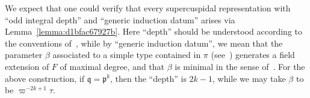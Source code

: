 \documentclass[reqno]{amsart}
\theoremstyle{plain} \newtheorem{theorem} {Theorem} \newtheorem{conjecture} {Conjecture} \newtheorem{corollary} [theorem] {Corollary} \newtheorem{proposition} [theorem] {Proposition} \newtheorem{fact} [theorem] {Fact}
\theoremstyle{definition} \newtheorem{definition} [theorem] {Definition}
\theoremstyle{itplain} %
\newcommand{\mfq}{\mathfrak{q}}
\begin{document}
\begin{remark}\label{Rem:supercuspidalclassification}
  We expect that one could verify that every supercuspidal representation with ``odd integral depth'' and ``generic induction datum'' arises via Lemma~\ref{lemma:d1bfac67927b}.  Here ``depth'' should be understood according to the conventions of~\cite[\S5.1]{moyUnrefinedMinimalKtypes1994}, while by ``generic induction datum'', we mean that the parameter $\beta$ associated to a simple type contained in $\pi$ (see~\cite[(3.2.1)]{BK}) generates a field extension of $F$ of maximal degree, and that $\beta$ is minimal in the sense of~\cite[(1.4.14)]{BK}.  For the above construction, if $\mfq = \mathfrak{p}^k$, then the ``depth'' is $2k - 1$, while we may take $\beta$ to be $\varpi^{- 2k + 1} \tau$.
\end{remark}
\end{document}

